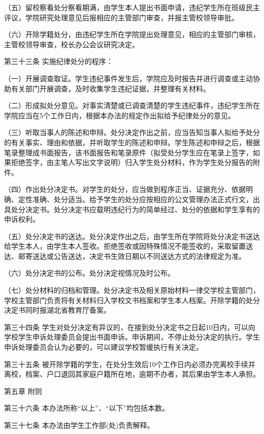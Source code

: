 \documentclass[UTF8,12pt,a4paper]{report}
\begin{document}
（五）留校察看处分察看期满，由学生本人提出书面申请，违纪学生所在班级民主评议，学院研究处理意见后报相应的主管部门审查，并报主管校领导审批。

（六）开除学籍处分，由违纪学生所在学院提出处理意见，相应的主管部门审核，主管校领导审查，校长办公会议研究决定。

第三十三条  实施纪律处分的程序：

（一）开展调查取证。学生违纪事件发生后，学院应及时报告并进行调查或主动协助有关部门开展调查，及时收集学生违纪证据，并整理有关材料。

（二）形成拟处分意见。对事实清楚或已调查清楚的学生违纪事件，违纪学生所在学院应当在5个工作日内，根据本办法的规定作出拟给予纪律处分的意见。

（三）听取当事人的陈述和申辩。处分决定作出之前，应当告知当事人拟给予处分的有关事实、理由和依据，并听取学生的陈述和申辩。学生陈述和申辩之后，根据笔录整理成书面报告，该书面报告和笔录原件（拟受处分学生应在笔录上签字，如果拒绝签字，由主笔人写出文字说明）归入学生处分材料，作为学生处分报告的附件。

（四）作出处分决定书。对学生的处分，应当做到程序正当、证据充分、依据明确、定性准确、处分适当。给予学生的处分应按相应的公文管理办法正式行文，出具处分决定书。处分决定书应载明违纪行为的简单经过、处分的依据和学生享有的申诉权利。 

（五）处分决定书的送达。处分决定作出之后，由学生所在学院将处分决定书送达给学生本人，由学生本人签收。拒绝签收或因特殊情况不能签收的，采取留置送达、邮寄送达或公告送达，决定书生效日期以不同送达方式的法律规定为准。

（六）处分决定书的公布。处分决定视情况及时公布。

（七）处分材料的归档和管理。处分决定书及相关原始材料一律交学校主管部门，学校主管部门负责将有关材料归入学校文书档案和学生本人档案。开除学籍的处分决定书同时报湖北省教育厅备案。

第三十四条  学生对处分决定有异议的，在接到处分决定书之日起10日内，可以向学校学生申诉处理委员会提出书面申诉。申诉期间，不停止处分决定的执行。学生申诉处理委员会认为必要的，可以建议学校暂缓执行有关决定。

第三十五条  被开除学籍的学生，在处分生效后10个工作日内必须办完离校手续并离校，档案、户口退回其家庭户籍所在地，逾期不办者，其后果由学生本人承担。



第五章  附则

第三十六条  本办法所称“以上”、“以下”均包括本数。

第三十七条  本办法由学生工作部(处)负责解释。
\end{document}
